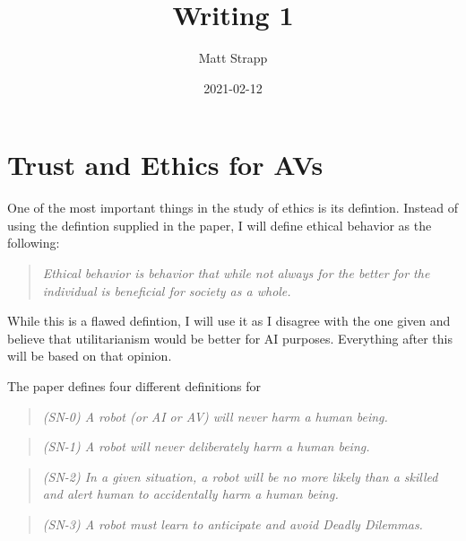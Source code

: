 \documentclass{article}
\title{Writing 1}
\author{Matt Strapp}
\date{2021-02-12}
\begin{document}
   \maketitle
   \section*{Trust and Ethics for AVs}
   One of the most important things in the study of ethics is its defintion. Instead of using the defintion supplied in the paper, I will define ethical behavior as the following:   
   \begin{quote}
      \emph{Ethical behavior is behavior that while not always for the better for the individual is beneficial for society as a whole.}
   \end{quote}
   While this is a flawed defintion, I will use it as I disagree with the one given and believe that utilitarianism would be better for AI purposes. Everything after this will be based on that opinion.

   The paper defines four different definitions for 
   \begin{quote}
      \emph{(SN-0) A robot (or AI or AV) will never harm a human being.}
   \end{quote}
   
   \begin{quote}
      \emph{(SN-1) A robot will never deliberately harm a human being.}
   \end{quote}

   \begin{quote}
      \emph{(SN-2) In a given situation, a robot will be no more likely than a skilled and alert human 
      to accidentally harm a human being.}
   \end{quote}

   \begin{quote}
      \emph{(SN-3) A robot must learn to anticipate and avoid Deadly Dilemmas. }
   \end{quote}
    
\end{document}
